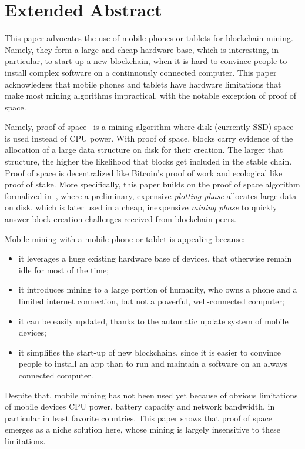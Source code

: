 \section{Extended Abstract}\label{sec:extended_abstract}

This paper advocates the use of mobile phones or tablets for blockchain mining.
Namely, they form a large and cheap hardware base, which is
interesting, in particular, to start up a new blockchain, when it is
hard to convince people to install complex software
on a continuously connected computer. This paper acknowledges that mobile phones
and tablets have hardware limitations that make most mining algorithms impractical,
with the notable exception of proof of space.

Namely, proof of space~\cite{AbusalahACKPR17,AtenieseBFG14,CohenP19,DziembowskiFKP15,ParkKFGAP18,RenD16,Spoto25}
is a mining algorithm where disk (currently SSD) space
is used instead of CPU power.
With proof of space, blocks carry evidence
of the allocation of a large data structure on disk for their creation.
The larger that structure, the higher the likelihood that
blocks get included in the stable chain. Proof of space is decentralized like
Bitcoin's proof of work and ecological like proof of stake.
More specifically, this paper builds on the proof of space algorithm formalized in~\cite{Spoto25},
where a preliminary, expensive
\emph{plotting phase} allocates large data on disk,
which is later used in a
cheap, inexpensive \emph{mining phase} to quickly answer
block creation challenges received from blockchain peers.

Mobile mining with a mobile phone or tablet is appealing because:
%
\begin{itemize}
\item it leverages a huge existing hardware base of devices, that otherwise remain idle
  for most of the time;
\item it introduces mining to a large portion of humanity, who owns a
  phone and a limited internet connection, but not a powerful, well-connected computer;
\item it can be easily updated, thanks to the automatic update system of mobile devices;
\item it simplifies the start-up of new blockchains, since it is easier to convince people
  to install an app than to run and maintain a software on an always connected computer.
\end{itemize}
%
Despite that, mobile mining has not been used yet because of obvious limitations
of mobile devices \wrt{} CPU power, battery capacity and network bandwidth, in particular
in least favorite countries.
This paper shows that
proof of space emerges as a niche solution here, whose mining
is largely insensitive to these limitations.

